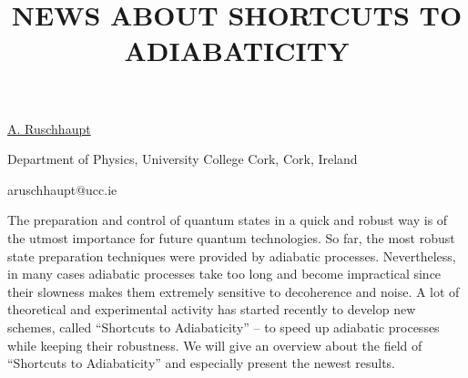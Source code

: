 \title{NEWS ABOUT SHORTCUTS TO ADIABATICITY}

\underline{A. Ruschhaupt} 

{\normalsize{\vspace{-4mm}
Department of Physics,
University College Cork,
Cork, Ireland

\email aruschhaupt@ucc.ie}}

The preparation and control of quantum states in a quick and robust way is of the utmost importance for future quantum technologies. So far, the most robust state preparation techniques were provided by adiabatic processes. Nevertheless, in many cases adiabatic processes take too long and become impractical since their slowness makes them extremely sensitive to decoherence and noise. A lot of theoretical and experimental activity has started recently to develop new schemes, called ``Shortcuts to Adiabaticity'' -- to speed up adiabatic processes while keeping their robustness. We will give an overview about the field of ``Shortcuts to Adiabaticity'' and especially present the newest results.

\vspace{\baselineskip}
